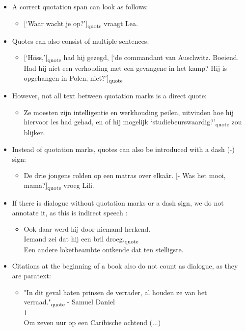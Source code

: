 \begin{itemize}
\item A correct quotation span can look as follows:
    \begin{itemize}[label={}]
        \item {[}`Waar wacht je op?'{]}\textsubscript{quote} vraagt Lea.
    \end{itemize}

\item Quotes can also consist of multiple sentences:
    \begin{itemize}[label={}]
        \item {[}`Höss,'{]}\textsubscript{quote} had hij gezegd, {[}`de commandant van Auschwitz. Boeiend. Had hij niet een verhouding met een gevangene in het kamp? Hij is opgehangen in Polen, niet?'{]}\textsubscript{quote}
    \end{itemize}
    
\pagebreak\item However, not all text between quotation marks is a direct quote:
    \begin{itemize}[label={}]
        \item Ze moesten zijn intelligentie en werkhouding peilen, uitvinden hoe hij hiervoor les had gehad, en of hij mogelijk \n{[}`studiebeurswaardig?'\n{]}\textsubscript{quote} zou blijken.
     \end{itemize}

\item Instead of quotation marks, quotes can also be introduced with a dash (-) sign:
    \begin{itemize}[label={}]
        \item De drie jongens rolden op een matras over elkaâr.
        {[}- Was het mooi, mama?{]}\textsubscript{quote} vroeg Lili.
    \end{itemize}

\item If there is dialogue without quotation marks or a dash sign, we do not annotate it, as this is indirect speech \citep{van2003literair}:
    \begin{itemize}[label={}]
        \item  Ook daar werd hij door niemand herkend.\\
        Iemand zei \n{[}dat hij een bril droeg.\n{]}\textsubscript{quote}\\
        Een andere loketbeambte ontkende dat ten stelligste.
    \end{itemize}

\item Citations at the beginning of a book also do not count as dialogue, as they are paratext:
    \begin{itemize}[label={}]
        \item \n{[}"In dit geval haten prinsen de verrader, al houden ze van het \\verraad."\n{]}\textsubscript{quote} - Samuel Daniel \\
        1\\
        Om zeven uur op een Caribische ochtend (...)
    \end{itemize}
\end{itemize}


